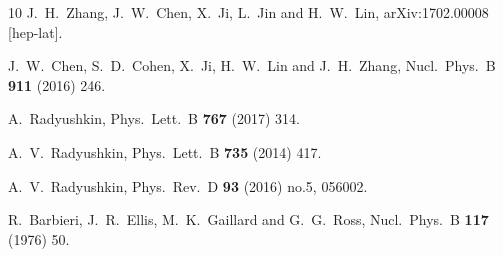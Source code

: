 \documentclass[final,5p,times,twocolumn]{elsarticle}
\begin{document}
\begin{thebibliography}{10}
  J.~H.~Zhang, J.~W.~Chen, X.~Ji, L.~Jin and H.~W.~Lin,
  arXiv:1702.00008 [hep-lat].

  J.~W.~Chen, S.~D.~Cohen, X.~Ji, H.~W.~Lin and J.~H.~Zhang,
  Nucl.\ Phys.\ B {\bf 911} (2016) 246.





  A.~Radyushkin,
  Phys.\ Lett.\ B {\bf 767} (2017) 314.



  A.~V.~Radyushkin,
  Phys.\ Lett.\ B {\bf 735} (2014) 417.



  A.~V.~Radyushkin,
  Phys.\ Rev.\ D {\bf 93} (2016) no.5,  056002.



  R.~Barbieri, J.~R.~Ellis, M.~K.~Gaillard and G.~G.~Ross,
  Nucl.\ Phys.\ B {\bf 117} (1976) 50.




\end{thebibliography}
\end{document}
